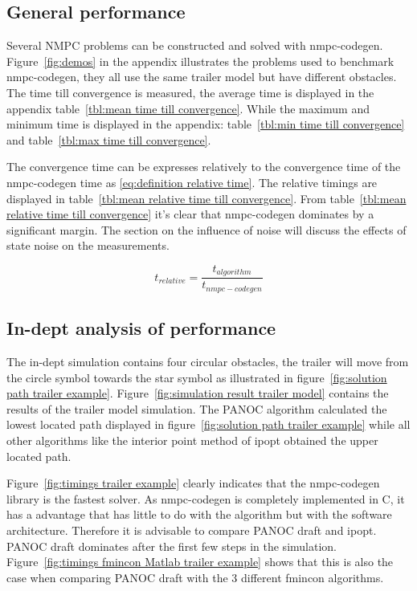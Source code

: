 \subsection{General performance}
Several NMPC problems can be constructed and solved with nmpc-codegen. Figure~\ref{fig:demos} in the appendix illustrates the problems used to benchmark nmpc-codegen, they all use the same trailer model but have different obstacles. The time till convergence is measured, the average time is displayed in the appendix table~\ref{tbl:mean time till convergence}. While the maximum and minimum time is displayed in the appendix: table~\ref{tbl:min time till convergence} and table~\ref{tbl:max time till convergence}.

The convergence time can be expresses relatively to the convergence time of the nmpc-codegen time as \eqref{eq:definition relative time}. The relative timings are displayed in table~\ref{tbl:mean relative time till convergence}. From table~\ref{tbl:mean relative time till convergence} it's clear that nmpc-codegen dominates by a significant margin. The section on the influence of noise will discuss the effects of state noise on the measurements.

\begin{equation}
	t_{relative} = \frac{t_{algorithm}}{t_{nmpc-codegen}}
	\label{eq:definition relative time}
\end{equation}

\subsection{In-dept analysis of performance}
The in-dept simulation contains four circular obstacles, the trailer will move from the circle symbol towards the star symbol as illustrated in figure~\ref{fig:solution path trailer example}. Figure~\ref{fig:simulation result trailer model} contains the results of the trailer model simulation. The PANOC algorithm calculated the lowest located path displayed in figure~\ref{fig:solution path trailer example} while all other algorithms like the interior point method of ipopt obtained the upper located path.

Figure~\ref{fig:timings trailer example} clearly indicates that the nmpc-codegen library is the fastest solver. As nmpc-codegen is completely implemented in C, it has a advantage that has little to do with the algorithm but with the software architecture. Therefore it is advisable to compare PANOC draft and ipopt. PANOC draft dominates after the first few steps in the simulation. Figure~\ref{fig:timings fmincon Matlab trailer example} shows that this is also the case when comparing PANOC draft with the 3 different fmincon algorithms.

